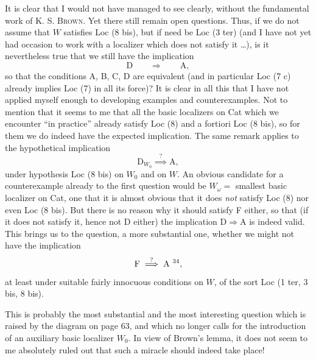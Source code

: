 \leavevmode{}%
It is clear that I would not have managed to see clearly, without the fundamental work of K. S. \textsc{Brown}. Yet there still remain open questions. Thus, if we do not assume that $W$ satisfies Loc (8 bis), but if need be Loc (3 ter) (and I have not yet had occasion to work with a localizer which does not satisfy it \ldots), is it nevertheless true that we still have the implication
\[
\mathrm{D} \qquad \Longrightarrow \qquad \mathrm{A},
\]
so that the conditions A, B, C, D are equivalent (and in particular Loc (7 c) already implies Loc (7) in all its force)? It is clear in all this that
%
I have not applied myself enough to developing examples and counterexamples. Not to mention that it seems to me that all the basic localizers on Cat which we encounter ``in practice'' already satisfy Loc (8) and a fortiori Loc (8 bis), so for them we do indeed have the expected implication. The same remark applies to the hypothetical implication
\[
\mathrm{D}_{W_0} \overset{?}{\implies} \mathrm{A},
\]
under hypothesis Loc (8 bis) on $W_0$ and on $W$. An obvious candidate for a counterexample already to the first question would be $W_\omega=$ smallest basic localizer on Cat, one that it is almost obvious that it does \textit{not} satisfy Loc (8) nor even Loc (8 bis). But there is no reason why it should satisfy F either, so that (if it does not satisfy it, hence not D either) the implication $\mathrm{D}\Longrightarrow\mathrm{A}$ is indeed valid. This brings us to the question, a more substantial one, whether we might not have the implication %
%
\[
\mathrm{F} \overset{?}{\implies} \mathrm{A}\ \text{\footnotemark[34]},
\]
%
at least under suitable fairly innocuous conditions on $W$, of the sort Loc (1 ter, 3 bis, 8 bis).

This is probably the most substantial and the most interesting question which is raised by the diagram on page 63, and which no longer calls for the introduction of an auxiliary basic localizer $W_0$. In view of Brown's lemma, it does not seem to me absolutely ruled out that such a miracle should indeed take place!

